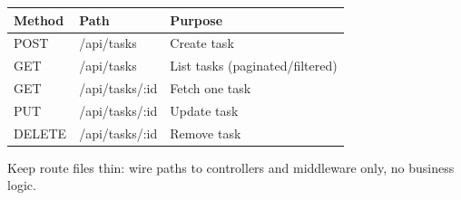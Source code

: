 \begin{table}[h]
\centering
\begin{tabularx}{\textwidth}{l l X}
\toprule
\textbf{Method} & \textbf{Path} & \textbf{Purpose} \\
\midrule
POST   & /api/tasks      & Create task \\
GET    & /api/tasks      & List tasks (paginated/filtered) \\
GET    & /api/tasks/:id  & Fetch one task \\
PUT    & /api/tasks/:id  & Update task \\
DELETE & /api/tasks/:id  & Remove task \\
\bottomrule
\end{tabularx}
\end{table}

\begin{tipbox}[TIP]
Keep route files thin: wire paths to controllers and middleware only, no business logic.
\end{tipbox}
